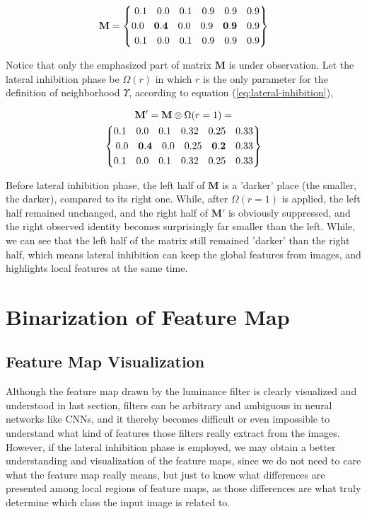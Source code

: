 \documentclass[conference]{IEEEtran}
\begin{document}
\begin{equation}
\mathbf{M} = \left\{
\begin{aligned}
    0.1\quad0.0\quad0.1\quad0.9\quad0.9\quad0.9\\
    0.0\quad\mathbf{0.4}\quad0.0\quad0.9\quad\mathbf{0.9}\quad0.9\\
    0.1\quad0.0\quad0.1\quad0.9\quad0.9\quad0.9\\
\end{aligned}
\right\}
\notag
\end{equation}

Notice that only the emphasized part of matrix $\mathbf{M}$ is under observation.
Let the lateral inhibition phase be $\Omega(r)$ in which $r$ is the only parameter
for the definition of neighborhood $\Upsilon$, according to equation (\ref{eq:lateral-inhibition}),

\begin{multline}
\mathbf{M'}=\mathbf{M}\otimes\Omega(r=1) = \\
\left\{
\begin{aligned}
    0.1\quad    0.0\quad            0.1\quad    0.32\quad    0.25\quad          0.33\\
    0.0\quad    \mathbf{0.4}\quad   0.0\quad    0.25\quad    \mathbf{0.2}\quad  0.33\\
    0.1\quad    0.0\quad            0.1\quad    0.32\quad    0.25\quad          0.33\\
\end{aligned}
\right\}
\notag
\end{multline}

Before lateral inhibition phase, the left half of $\mathbf{M}$ is a 'darker' place
(the smaller, the darker),
compared to its right one. While, after $\Omega(r=1)$ is applied, the left half
remained unchanged, and the right half of $\mathbf{M'}$ is obviously suppressed,
and the right observed identity becomes surprisingly far smaller than the left.
While, we can see that the left half of the matrix still remained 'darker' than the right half,
which means lateral inhibition can keep the global features from images, and
highlights local features at the same time.

\section{Binarization of Feature Map}
\subsection{Feature Map Visualization}
Although the feature map drawn by the luminance filter is clearly visualized and understood
in last section, filters can be arbitrary and ambiguous in neural networks like CNNs,
and it thereby becomes difficult or even impossible to understand what kind of features those
filters really extract from the images.
However, if the lateral inhibition phase is employed,
we may obtain a better understanding and visualization of the feature maps, since we do not need
to care what the feature map really means, but just to know what differences are presented
among local regions of feature maps, as those differences are what truly determine which class
the input image is related to.
\end{document}

